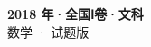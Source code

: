\documentclass[zihao=-4, a4paper]{ctexart}
\begin{document}
\begin{center}
  {\Large\bfseries 2018 年·全国Ⅰ卷·文科}\\[4pt]
  {\large 数学 · 试题版}
\end{center}
\medskip
{}

\end{document}
